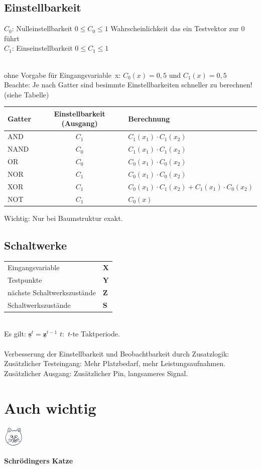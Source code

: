 \documentclass[6pt,a4paper]{scrartcl}
\newcommand{\utilde}[1]{#1}
\renewcommand{\emph}[1]{\textsf{\textbf{#1}}}
\renewcommand{\vec}[1]{\ensuremath{\underline{\boldsymbol {#1}}}}
\newcommand{\ma}[1]{\ensuremath{\utilde{\bs {#1}}}}
\newcommand{\bs}[1]{\ensuremath{\boldsymbol{#1}}}								%
\renewcommand{\vec}[1]{\ensuremath{\underline{\boldsymbol {#1}}}}
\begin{document}
\begin{multicols}{3}
	\subsection{Einstellbarkeit}
	\parbox{2.5cm}{  }
	\parbox{4.0cm}{
		$C_0$: Nulleinstellbarkeit $ 0 \le C_0 \le 1 $ Wahrscheinlichkeit das ein Testvektor zur 0 führt\\
		$C_1$: Einseinstellbarkeit $ 0 \le C_1 \le 1 $
	}\\
	ohne Vorgabe für Eingangsvariable~x: $C_0(x)=0,5$ und $C_1(x)=0,5$\\
	Beachte: Je nach Gatter sind besimmte Einstellbarkeiten schneller zu berechnen! (siehe Tabelle)\\
	\begin{tabular}{l|c|l}
	Gatter & Einstellbarkeit (Ausgang) & Berechnung\\ \midrule
	AND & $C_1$ & $C_1(x_1) \cdot C_1(x_2)$ \\
	NAND & $ C_0$ & $C_1(x_1) \cdot C_1(x_2)$ \\
	OR & $C_0$ & $C_0(x_1) \cdot C_0(x_2)$ \\
	NOR & $C_1$ & $C_0(x_1) \cdot C_0(x_2)$ \\
	XOR & $C_1$ & $C_0(x_1) \cdot C_1(x_2) + C_1(x_1) \cdot C_0(x_2)$ \\
	NOT & $C_1$ & $C_0(x)$ \\
	\end{tabular}
	\newline Wichtig: Nur bei Baumstruktur exakt.\\

	\subsection{Schaltwerke}
	\begin{tabular}{ll}
		Eingangsvariable 			& 		$\ma X$	\\
		Testpunkte 					& 		$\ma Y$	\\
		nächste Schaltwerkszustände & 		$\ma Z$	\\
		Schaltwerkszustände 		&		$\ma S$	\\
	\end{tabular}									\\
	
	Es gilt: $\vec s^t = \vec z^{t-1}$ \qquad $t:$ $t$-te Taktperiode.\\
	\\
	Verbesserung der Einstellbarkeit und Beobachtbarkeit durch Zusatzlogik:\\
	Zusätzlicher Testeingang: Mehr Platzbedarf, mehr Leistungsaufnahmen.\\
	Zusätzlicher Ausgang: Zusätzlicher Pin, langsameres Signal.\\
	
\section{Auch wichtig}
\parbox{1.2cm}{
 \includegraphics[width=1cm]{./cat.jpg}
 }
 \parbox{3cm}{
\emph{Schrödingers Katze}
}
\end{multicols}


\end{document}
